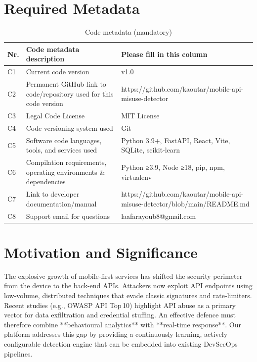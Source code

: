 \documentclass[preprint,12pt,a4paper]{elsarticle}
\begin{document}
\section*{Required Metadata}
\begin{table}[!h]
\centering
\begin{tabular}{|l|p{6.5cm}|p{6.5cm}|}
\hline
\textbf{Nr.} & \textbf{Code metadata description} & \textbf{Please fill in this column} \\
\hline
C1 & Current code version & v1.0 \\
\hline
C2 & Permanent GitHub link to code/repository used for this code version & https://github.com/kaoutar/mobile-api-misuse-detector \\
\hline
C3 & Legal Code License & MIT License \\
\hline
C4 & Code versioning system used & Git \\
\hline
C5 & Software code languages, tools, and services used & Python 3.9+, FastAPI, React, Vite, SQLite, scikit‑learn \\
\hline
C6 & Compilation requirements, operating environments \& dependencies & Python ≥3.9, Node ≥18, pip, npm, virtualenv \\
\hline
C7 & Link to developer documentation/manual & https://github.com/kaoutar/mobile-api-misuse-detector/blob/main/README.md \\
\hline
C8 & Support email for questions & laafarayoub8@gmail.com \\
\hline
\end{tabular}
\caption{Code metadata (mandatory)}
\end{table}

\section{Motivation and Significance}
The explosive growth of mobile‑first services has shifted the security perimeter from the device to the back‑end APIs. Attackers now exploit API endpoints using low‑volume, distributed techniques that evade classic signatures and rate‑limiters. Recent studies (e.g., OWASP API Top 10) highlight API abuse as a primary vector for data exfiltration and credential stuffing. An effective defence must therefore combine **behavioural analytics** with **real‑time response**. Our platform addresses this gap by providing a continuously learning, actively configurable detection engine that can be embedded into existing DevSecOps pipelines.
\end{document}
